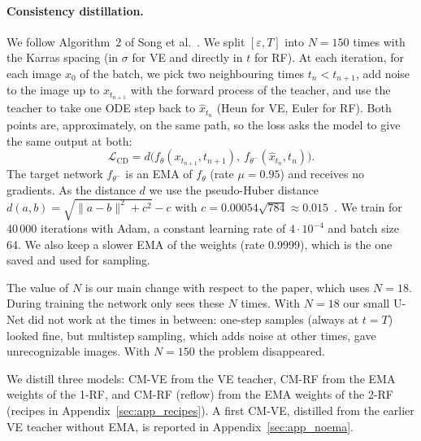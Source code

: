 \documentclass{article}
\begin{document}
\paragraph{Consistency distillation.} We follow Algorithm~2 of Song et
al.~\cite{song2023consistency}. We split $[\varepsilon, T]$ into $N = 150$ times
with the Karras spacing (in $\sigma$ for VE and directly in $t$ for RF). At each
iteration, for each image $x_0$ of the batch, we pick two neighbouring times
$t_n < t_{n+1}$, add noise to the image up to $x_{t_{n+1}}$ with the forward
process of the teacher, and use the teacher to take one ODE step back to
$\hat{x}_{t_n}$ (Heun for VE, Euler for RF). Both points are, approximately, on
the same path, so the loss asks the model to give the same output at both:
\begin{equation}
  \mathcal{L}_\text{CD} = d\big(f_\theta(x_{t_{n+1}}, t_{n+1}),\ f_{\theta^-}(\hat{x}_{t_n}, t_n)\big).
\end{equation}
The target network $f_{\theta^-}$ is an EMA of $f_\theta$ (rate $\mu = 0.95$)
and receives no gradients. As the distance $d$ we use the pseudo-Huber distance
$d(a, b) = \sqrt{\|a - b\|^2 + c^2} - c$ with
$c = 0.00054\sqrt{784} \approx 0.015$~\cite{song2024improved}. We train for
40\,000 iterations with Adam, a constant learning rate of $4\cdot10^{-4}$ and
batch size 64. We also keep a slower EMA of the weights (rate 0.9999), which is
the one saved and used for sampling.

The value of $N$ is our main change with respect to the paper, which uses
$N = 18$. During training the network only sees these $N$ times. With $N = 18$
our small U-Net did not work at the times in between: one-step samples (always
at $t = T$) looked fine, but multistep sampling, which adds noise at other
times, gave unrecognizable images. With $N = 150$ the problem disappeared.

We distill three models: CM-VE from the VE teacher, CM-RF from the EMA weights
of the 1-RF, and CM-RF (reflow) from the EMA weights of the 2-RF (recipes in
Appendix~\ref{sec:app_recipes}). A first CM-VE, distilled from the earlier VE
teacher without EMA, is reported in Appendix~\ref{sec:app_noema}.
\end{document}
